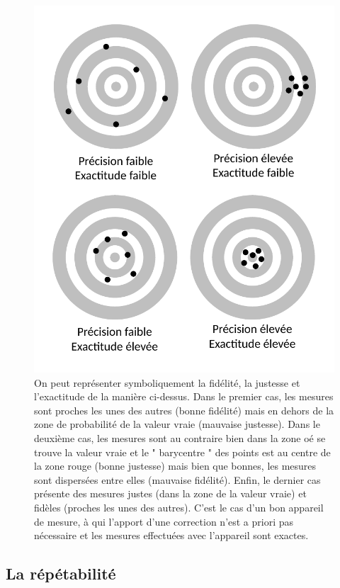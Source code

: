 \begin{figure}[htbp]
    \centering
    \includegraphics[width=12cm]{assets/figures/juste-fidèle-précis.pdf}
    \caption{On peut représenter symboliquement la fidélité, la justesse et l'exactitude de la manière ci-dessus. Dans le premier cas, les mesures sont proches les unes des autres (bonne fidélité) mais en dehors de la zone de probabilité de la valeur vraie (mauvaise justesse). Dans le deuxième cas, les mesures sont au contraire bien dans la zone oé se trouve la valeur vraie et le " barycentre " des points est au centre de la zone rouge (bonne justesse) mais bien que bonnes, les mesures sont dispersées entre elles (mauvaise fidélité). Enfin, le dernier cas présente des mesures justes (dans la zone de la valeur vraie) et fidèles (proches les unes des autres). C'est le cas d'un bon appareil de mesure, à qui l'apport d'une correction n'est a priori pas nécessaire et les mesures effectuées avec l'appareil sont exactes.}
    \label{fig:exact}
\end{figure}

\subsection{La répétabilité}

